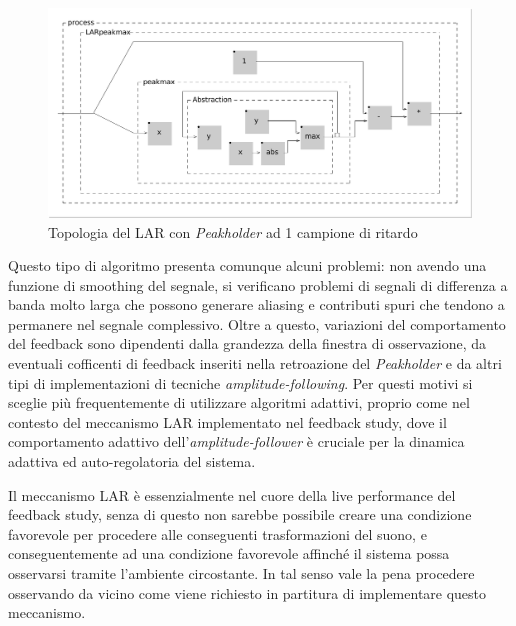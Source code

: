 \begin{figure}[h!]
\begin{center}
    \includegraphics[width=14cm]{figures/LARpeakmax.pdf} 
    \caption{Topologia del LAR con \textit{Peakholder} ad 1 campione di ritardo} 
\end{center}
\vspace{0.5cm}
\end{figure} 

Questo tipo di algoritmo presenta comunque alcuni problemi: non avendo
una funzione di smoothing del segnale, si verificano problemi di segnali di differenza a banda
molto larga che possono generare aliasing e contributi spuri che tendono a permanere nel
segnale complessivo.
Oltre a questo, variazioni del comportamento del feedback sono dipendenti dalla grandezza
della finestra di osservazione, da eventuali cofficenti di feedback inseriti nella
retroazione del \textit{Peakholder} e da altri tipi di implementazioni di tecniche 
\textit{amplitude-following}. Per questi motivi si sceglie più frequentemente di utilizzare algoritmi
adattivi, proprio come nel contesto del meccanismo LAR implementato nel feedback study,
dove il comportamento adattivo dell'\textit{amplitude-follower} è cruciale
per la dinamica adattiva ed auto-regolatoria del sistema.

Il meccanismo LAR è essenzialmente nel cuore della live performance del feedback study,
senza di questo non sarebbe possibile creare una condizione favorevole per procedere alle 
conseguenti trasformazioni del suono, e conseguentemente ad una condizione favorevole affinché il 
sistema possa osservarsi tramite l'ambiente circostante. 
In tal senso vale la pena procedere osservando da vicino come viene richiesto in partitura 
di implementare questo meccanismo.

